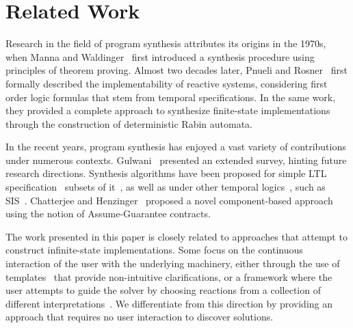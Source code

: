 \section{Related Work}
\label{sec:related}


Research in the field of program synthesis attributes its origins in the 1970s,
when Manna and Waldinger~\cite{manna1971toward} first introduced a synthesis
procedure using principles of theorem proving. Almost two decades later, Pnueli
and Rosner~\cite{DBLP:conf/popl/PnueliR89} first formally described the
implementability of reactive systems, considering first order logic formulas
that stem from temporal specifications. In the same work, they provided a
complete approach to synthesize finite-state implementations through the
construction of deterministic Rabin automata.

In the recent years, program synthesis has enjoyed a vast variety of
contributions under numerous contexts. Gulwani~\cite{gulwani2010dimensions}
presented an extended survey, hinting future research directions. Synthesis
algorithms have been proposed for simple LTL specification~\cite{Bohy12,Tini03}
subsets of it~\cite{Klein10,ehlers2010symbolic,cheng2016structural}, as well as under other temporal logics~\cite{monmege2016real,Hamza10}, such as SIS~\cite{Aziz95}.
Chatterjee and Henzinger~\cite{Chatterjee07} proposed a novel component-based approach using the notion of Assume-Guarantee contracts. 

The work presented in this paper is closely related to approaches that attempt
to construct infinite-state implementations. Some focus on the continuous
interaction of the user with the underlying machinery, either through the use of templates~\cite{srivastava2013template,beyene2014constraint} that
provide non-intuitive clarifications, or a framework where the user attempts to
guide the solver by choosing reactions from a collection of different
interpretations~\cite{ryzhyk2016developing}. We differentiate from this
direction by providing an approach that requires no user interaction to discover solutions.

